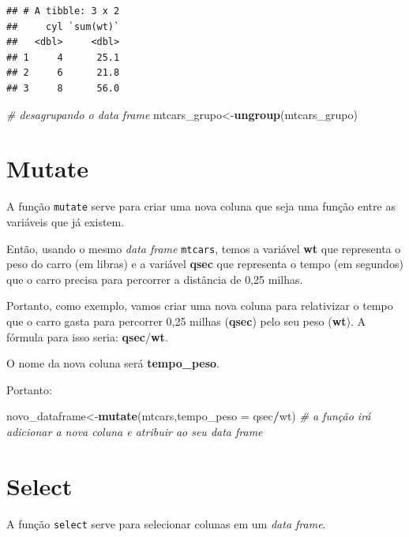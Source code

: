 \documentclass[
]{book}
\newenvironment{Shaded}{\begin{snugshade}}{\end{snugshade}}
\newcommand{\CommentTok}[1]{\textcolor[rgb]{0.56,0.35,0.01}{\textit{#1}}}
\newcommand{\DataTypeTok}[1]{\textcolor[rgb]{0.13,0.29,0.53}{#1}}
\newcommand{\KeywordTok}[1]{\textcolor[rgb]{0.13,0.29,0.53}{\textbf{#1}}}
\newcommand{\NormalTok}[1]{#1}
\newcommand{\OperatorTok}[1]{\textcolor[rgb]{0.81,0.36,0.00}{\textbf{#1}}}
\begin{document}
\begin{verbatim}
## # A tibble: 3 x 2
##     cyl `sum(wt)`
##   <dbl>     <dbl>
## 1     4      25.1
## 2     6      21.8
## 3     8      56.0
\end{verbatim}

\begin{Shaded}
\begin{Highlighting}[]
\CommentTok{# desagrupando o data frame}
\NormalTok{mtcars_grupo<-}\KeywordTok{ungroup}\NormalTok{(mtcars_grupo)}
\end{Highlighting}
\end{Shaded}

\hypertarget{mutate}{%
\section{Mutate}\label{mutate}}

A função \texttt{mutate} serve para criar uma nova coluna que seja uma
função entre as variáveis que já existem.

Então, usando o mesmo \emph{data frame} \texttt{mtcars}, temos a
variável \textbf{wt} que representa o peso do carro (em libras) e a
variável \textbf{qsec} que representa o tempo (em segundos) que o carro
precisa para percorrer a distância de 0,25 milhas.

Portanto, como exemplo, vamos criar uma nova coluna para relativizar o
tempo que o carro gasta para percorrer 0,25 milhas (\textbf{qsec}) pelo
seu peso (\textbf{wt}). A fórmula para isso seria:
\textbf{qsec}/\textbf{wt}.

O nome da nova coluna será \textbf{tempo\_peso}.

Portanto:

\begin{Shaded}
\begin{Highlighting}[]
\NormalTok{novo_dataframe<-}\KeywordTok{mutate}\NormalTok{(mtcars,}\DataTypeTok{tempo_peso =}\NormalTok{ qsec}\OperatorTok{/}\NormalTok{wt) }\CommentTok{# a função irá adicionar a nova coluna e atribuir ao seu data frame}
\end{Highlighting}
\end{Shaded}

\hypertarget{select}{%
\section{Select}\label{select}}

A função \texttt{select} serve para selecionar colunas em um \emph{data
frame}.
\end{document}
